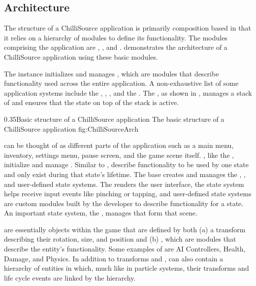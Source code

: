 \subsection{Architecture}\label{ssec:cs_engine_arch}

The structure of a ChilliSource application is primarily composition based in that it relies on a hierarchy of modules to define its functionality. The modules comprising the application are , ,  and .  demonstrates the architecture of a ChilliSource application using these basic modules.

The  instance initializes and manages , which are modules that describe functionality used across the entire application. A non-exhaustive list of some application systems include the , , , and the . The , as shown in , manages a stack of  and ensures that the state on top of the stack is active. 

{0.35}{Basic structure of a ChilliSource application}
{The basic structure of a ChilliSource application}
{fig:ChilliSourceArch}

 can be thought of as different parts of the application such as a main menu, inventory, settings menu, pause screen, and the game scene itself. , like the , initialize and manage . Similar to ,  describe functionality to be used by one state and only exist during that state's lifetime. The base  creates and manages the , , and user-defined state systems. The  renders the user interface, the  state system helps receive input events like pinching or tapping, and user-defined state systems are custom modules built by the developer to describe functionality for a state. An important state system, the , manages  that form that scene. 

 are essentially objects within the game that are defined by both (a) a transform describing their rotation, size, and position and (b) , which are modules that describe the entity's functionality. Some examples of  are AI Controllers, Health, Damage, and Physics. In addition to transforms and ,  can also contain a hierarchy of entities in which, much like in particle systems, their transforms and life cycle events are linked by the hierarchy. 

